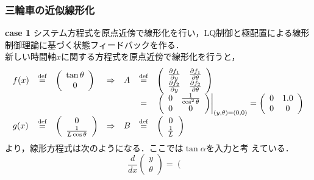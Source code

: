 \begin{frame}[t] 
\frametitle{三輪車の近似線形化}


\noindent
{\bf case 1} 
       システム方程式を原点近傍で線形化を行い，LQ制御と極配置による線形
       制御理論に基づく状態フィードバックを作る． \\
       新しい時間軸$x$に関する方程式を原点近傍で線形化を行うと，
\begin{equation*}
\begin{array}{lclclcl}
 f(x) &\stackrel{\rm def}{=}&
 \left(
 \begin{array}{c}
  \tan \theta \\
  0
 \end{array}
 \right) &\Rightarrow&
 A &\stackrel{\rm def}{=}&
 \left(
 \begin{array}{cc}
  \frac{\partial f_1}{\partial y} & \frac{\partial f_1}{\partial \theta} \\
  \frac{\partial f_2}{\partial y} & \frac{\partial f_2}{\partial \theta} 
 \end{array}
 \right) \\
 & & & & &=&
 \left. \left(
 \begin{array}{cc}
  0 & \frac{1}{\cos ^2 \theta} \\
  0 & 0
 \end{array}
 \right) \right|_{(y,\theta) = (0, 0)} =
 \left(
 \begin{array}{cc}
  0 & 1.0 \\
  0 & 0
 \end{array}
 \right) \\
 g(x) &\stackrel{\rm def}{=}&
 \left(
 \begin{array}{c}
  0 \\
  \frac{1}{L \cos \theta}
 \end{array}
 \right) &\Rightarrow&
 B &\stackrel{\rm def}{=}&
 \left(
 \begin{array}{c}
  0 \\
  \frac{1}{L}
 \end{array}
 \right)
\end{array}
\end{equation*}
       より，線形方程式は次のようになる．ここでは$\tan \alpha$を入力と考
       えている．
\begin{equation}
 \frac{d}{dx}\left(\begin{array}{c}
     y \\
     \theta 
   \end{array} \right) = \left(\begin{array}{cc}

\end{array}
\end{equation}
\end{frame}
